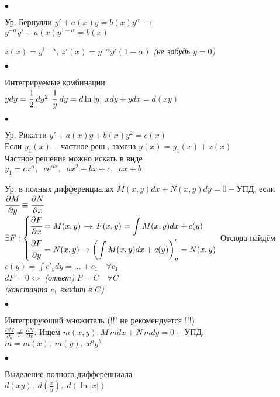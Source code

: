 \documentclass[11pt,a4paper]{article}
\newcommand{\romannum}[1]{\MakeUppercase{\romannumeral #1}}
\newcommand{\infers}{\,\to\,}
\newcommand{\bfend}{\textbf{--} }
\newcommand{\htext}{0.46\textwidth}
\begin{document}
{$\bullet$\;
\parbox[t][]{\htext}{Ур. Бернулли $y' +a(x)y = b(x)y^{\alpha} \infers$\\
$y^{-\alpha}y' + a(x)y^{1-\alpha} = b(x)$\par\smallskip
$z(x) = y^{1-\alpha}$,\; $z'(x) = y^{-\alpha}y' (1-\alpha)$ \small{\it (не забудь $y=0$)}
}\vspace{1em}

$\bullet$\;
\parbox[t][]{\htext}{Интегрируемые комбинации\\
$ydy = \cfrac{1}{2}\;dy^2$\quad\;
$\cfrac{1}{y}\;dy=d\ln|y|$\quad\;
$xdy + ydx = d(xy)$
}\vspace{1em}

$\bullet$\;
\parbox[t][]{\htext}{Ур. Рикатти $y'+a(x)y+b(x)y^2=c(x)$\\
Если $y_1(x)$ \bfend частное реш., замена $y(x)=y_1(x) + z(x)$\\
Частное решение можно искать в виде\\
$y_1 = cx^\alpha,\;\; ce^{\alpha x},\;\; ax^2+bx+c,\;\; ax+b$
}
\vspace{0.5em}

{\centering  %
\scalebox{1.8}{\romannum{4}.} Ур. в полных дифференциалах
$M(x,y)dx+N(x,y)dy=0$ \bfend УПД, если
$\cfrac{\partial M}{\partial y} \equiv \cfrac{\partial N}{\partial x}$\\
$\exists F:
\left\{
\begin{aligned}
& \cfrac{\partial F}{\partial x} = M(x,y) \infers F(x,y)=\int M(x,y)dx + c(y)\\
& \cfrac{\partial F}{\partial y} = N(x,y) \!\infers\! \left(\int M(x,y)dx + c(y)\right)'_y = N(x,y)
\end{aligned}
\right.
$\vspace{1em}
Отсюда найдём $c(y) = \int c'_y dy = \ldots + c_1\quad \forall c_1$\\
$dF = 0 \Leftrightarrow$ \small{\it (ответ)} $F = C \quad \forall C$\\
\small{\it (константа $c_1$ входит в $C$)}\\
}\vspace{0.5em}

$\bullet$\;
\parbox[t][]{\htext}{Интегрирующий множитель (!!! не рекомендуется !!!)\\
$\frac{\partial M}{\partial y} \neq \frac{\partial N}{\partial x}$. Ищем $m(x, y): M\,mdx+N\,mdy=0$ \bfend УПД.\\
$m=m(x),\; m(y),\; x^a y^b$
}\vspace{1em}

$\bullet$\;
\parbox[t][]{\htext}{Выделение полного дифференциала\\
$ d(xy),\; d(\frac{x}{y}),\; d(\ln|x|)$
}

}\vrule{} %
\end{document}
